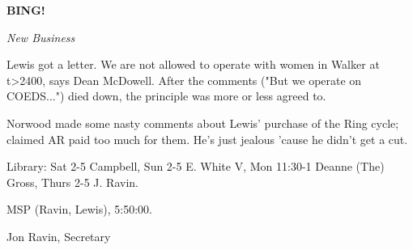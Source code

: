 \documentclass[12pt]{article}
\newcommand{\bing}{{\bf BING!} }
\newcommand{\goto}[1]{\bing \vskip 12pt \centerline{{\em{#1}}}}
\begin{document}
\goto{New Business}

Lewis got a letter. We are not allowed to operate with women in Walker at t>2400, says Dean McDowell. After the comments ("But we operate on COEDS...") died down, the principle was more or less agreed to.

Norwood made some nasty comments about Lewis' purchase of the Ring cycle; claimed AR paid too much for them. He's just jealous 'cause he didn't get a cut.

Library: Sat 2-5 Campbell, Sun 2-5 E. White V, Mon 11:30-1 Deanne (The) Gross, Thurs 2-5 J. Ravin.

MSP (Ravin, Lewis), 5:50:00.

\vspace{12pt}

\centerline{Jon Ravin, Secretary}
\end{document}
